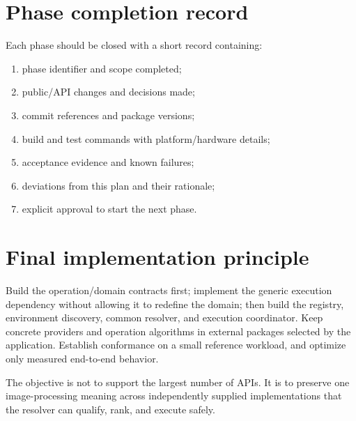 \section{Phase completion record}

Each phase should be closed with a short record containing:
\begin{enumerate}
  \item phase identifier and scope completed;
  \item public/API changes and decisions made;
  \item commit references and package versions;
  \item build and test commands with platform/hardware details;
  \item acceptance evidence and known failures;
  \item deviations from this plan and their rationale;
  \item explicit approval to start the next phase.
\end{enumerate}

\section{Final implementation principle}

Build the operation/domain contracts first; implement the generic execution dependency without allowing it to redefine the domain; then build the registry, environment discovery, common resolver, and execution coordinator. Keep concrete providers and operation algorithms in external packages selected by the application. Establish conformance on a small reference workload, and optimize only measured end-to-end behavior.

The objective is not to support the largest number of APIs. It is to preserve one image-processing meaning across independently supplied implementations that the resolver can qualify, rank, and execute safely.